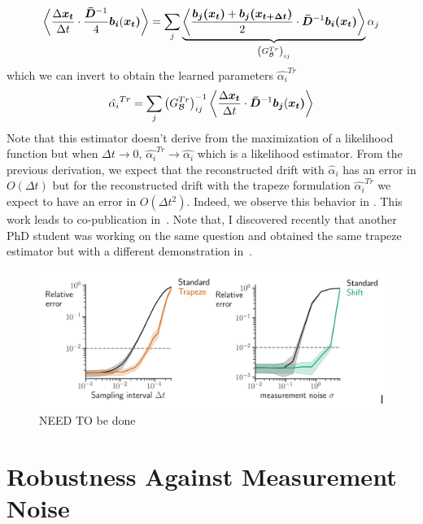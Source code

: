 \begin{equation}
    \left \langle \frac{\Delta\bm{x_t}}{\Delta t}\cdot \frac{\bm{\bar{D}}^{-1}}{4}\bm{b_i}(\bm{x_t)} \right \rangle = \sum_j \underbrace{\left \langle \frac{\bm{b_j(x_t)} + \bm{b_j(x_{t+\Delta t})}}{2} \cdot \bm{\bar{D}}^{-1}\bm{b_i(x_t)} \right \rangle}_{\left(G_{\mathcal{B}}^{Tr}\right)_{ij}} \alpha_j 
    \label{eq:chap_1_alpha_trapeze}
\end{equation}
which we can invert to obtain the learned parameters $\hat{\alpha_i}^{Tr}$
\begin{equation}
    \hat{\alpha_i}^{Tr} = \sum_j \left(G_{\mathcal{B}}^{Tr}\right)^{-1}_{ij} \left \langle \frac{\Delta\bm{x_t}}{\Delta t}\cdot \bm{\bar{D}}^{-1}\bm{b_j}(\bm{x_t)} \right \rangle
\end{equation}
Note that this estimator doesn't derive from the maximization of a likelihood function but when $\Delta t \to 0$, $\hat{\alpha_i}^{Tr}\to \hat{\alpha_i}$ which is a likelihood estimator. From the previous derivation, we expect that the reconstructed drift with $\hat{\alpha}_i$ has an error in $O(\Delta t)$ but for the reconstructed drift with the trapeze formulation $\hat{\alpha_i}^{Tr}$ we expect to have an error in $O(\Delta t^2)$. Indeed, we observe this behavior in . This work leads to co-publication in~\cite{amiriInferringGeometricalDynamics2024}. Note that, I discovered recently that another PhD student was working on the same question and obtained the same trapeze estimator but with a different demonstration in~\cite{wannerHigherOrderDrift2024}.

\begin{figure}
    \centering
    \includegraphics[width=0.5\linewidth]{fig/Lorenz_sampling_measurement noise_benchmark.png}
    \caption{NEED TO be done}
    \label{fig:Lorenz_benchmark}
\end{figure}












\section{Robustness Against Measurement Noise}

